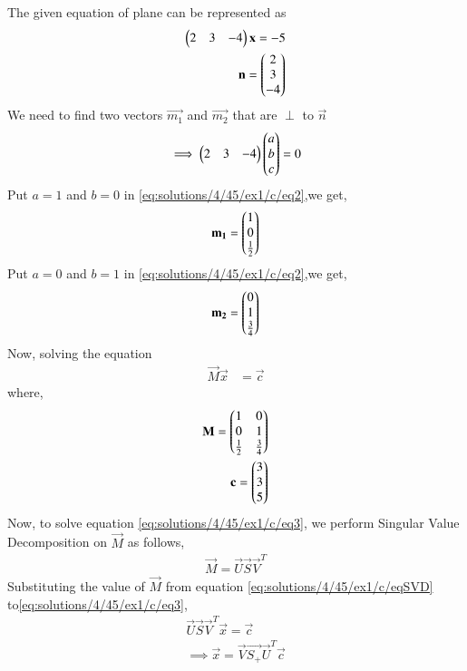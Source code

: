 
The given equation of plane can be represented as
\begin{align}
    \myvec{2 & 3 & -4}\Vec{x}=-5\label{eq:solutions/4/45/ex1/c/eq1}\\
    \vec{n}=\myvec{2\\3\\-4}
\end{align}
We need to find two vectors $\vec{m_1}$ and $\Vec{m_2}$ that are $\perp$ to $\vec{n}$
\begin{align}\label{eq:solutions/4/45/ex1/c/eq2}
	\implies\begin{pmatrix}2 & 3 & -4\end{pmatrix}\begin{pmatrix}a\\b\\c\end{pmatrix} = 0
\end{align}
Put $a=1$ and $b=0$ in \eqref{eq:solutions/4/45/ex1/c/eq2},we get,
\begin{align}
    \Vec{m_1}=\myvec{1\\0\\\frac{1}{2}}
\end{align}
Put $a=0$ and $b=1$ in \eqref{eq:solutions/4/45/ex1/c/eq2},we get,
\begin{align}
    \Vec{m_2}=\myvec{0\\1\\\frac{3}{4}}
\end{align}
Now, solving the equation
\begin{align}
	\label{eq:solutions/4/45/ex1/c/eq3}\vec{M}\Vec{x} &= \vec{c}
\end{align}
where,
\begin{align}
\Vec{M}=\myvec{1&0\\0&1\\\frac{1}{2}&\frac{3}{4}}&\\
    \vec{c}=\myvec{3\\3\\5}&
\end{align}
Now, to solve equation \eqref{eq:solutions/4/45/ex1/c/eq3}, we perform Singular Value Decomposition on $\vec{M}$ as follows,
\begin{align}
\vec{M}=\vec{U}\vec{S}\vec{V}^T\label{eq:solutions/4/45/ex1/c/eqSVD}
\end{align}
Substituting the value of $\Vec{M}$ from equation \eqref{eq:solutions/4/45/ex1/c/eqSVD} to\eqref{eq:solutions/4/45/ex1/c/eq3},
\begin{align}
    \vec{U}\vec{S}\vec{V}^T\Vec{x}=\vec{c}\\
    \implies \vec{x}=\vec{V}\vec{S_+}\vec{U}^T\Vec{c} \label{eq:solutions/4/45/ex1/c/eqX}
\end{align}
